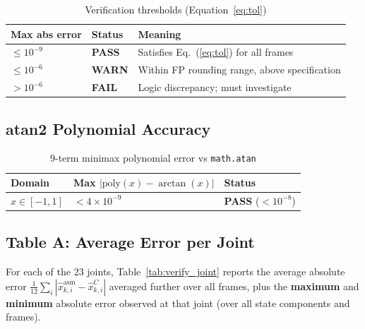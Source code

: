 \documentclass[12pt,a4paper]{article}
\begin{document}
\begin{table}[H]
\centering
\caption{Verification thresholds (Equation~\ref{eq:tol})}
\label{tab:thresholds}
\begin{tabular}{lll}
\toprule
\textbf{Max abs error} & \textbf{Status} & \textbf{Meaning} \\
\midrule
$\le 10^{-9}$  & \textbf{PASS} & Satisfies Eq.~(\ref{eq:tol}) for all frames \\
$\le 10^{-6}$  & \textbf{WARN} & Within FP rounding range, above specification \\
$> 10^{-6}$    & \textbf{FAIL} & Logic discrepancy; must investigate \\
\bottomrule
\end{tabular}
\end{table}

\subsection{atan2 Polynomial Accuracy}

\begin{table}[H]
\centering
\caption{9-term minimax polynomial error vs \texttt{math.atan}}
\label{tab:atanpoly}
\begin{tabular}{lll}
\toprule
\textbf{Domain} & \textbf{Max $|\text{poly}(x)-\arctan(x)|$} & \textbf{Status} \\
\midrule
$x \in [-1, 1]$ & $< 4\times10^{-9}$ & \textbf{PASS} ($< 10^{-8}$) \\
\bottomrule
\end{tabular}
\end{table}

\subsection{Table A: Average Error per Joint}

\noindent
For each of the 23 joints, Table~\ref{tab:verify_joint} reports the
average absolute error $\frac{1}{12}\sum_{i} |\hat{x}^{\text{asm}}_{k,i} - \hat{x}^{C}_{k,i}|$
averaged further over all frames, plus the \textbf{maximum} and
\textbf{minimum} absolute error observed at that joint (over all
state components and frames).
\end{document}
